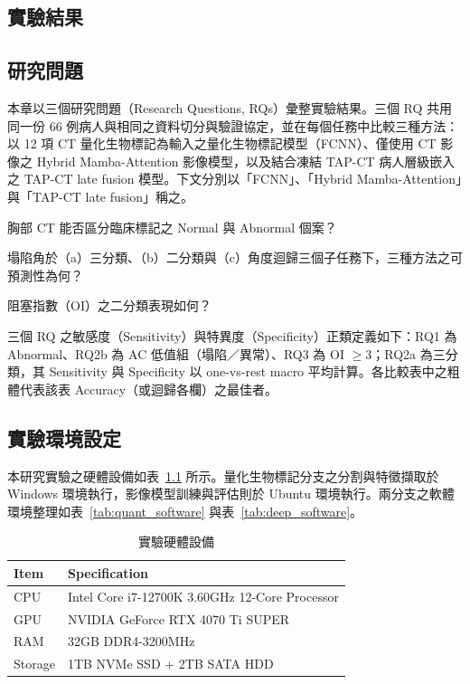 \begin{ZhChapter}

\chapter{實驗結果}

\section{研究問題}

本章以三個研究問題（Research Questions, RQs）彙整實驗結果。三個 RQ 共用同一份 66 例病人與相同之資料切分與驗證協定，並在每個任務中比較三種方法：以 12 項 CT 量化生物標記為輸入之量化生物標記模型（FCNN）、僅使用 CT 影像之 Hybrid Mamba-Attention 影像模型，以及結合凍結 TAP-CT 病人層級嵌入之 TAP-CT late fusion 模型。下文分別以「FCNN」、「Hybrid Mamba-Attention」與「TAP-CT late fusion」稱之。

\begin{list}{}{\setlength{\leftmargin}{4.2em}\setlength{\labelwidth}{3.4em}\setlength{\labelsep}{0.8em}\setlength{\itemsep}{0.35em}}
    \item[\textbf{RQ1：}]胸部 CT 能否區分臨床標記之 Normal 與 Abnormal 個案？
    \item[\textbf{RQ2：}]塌陷角於（a）三分類、（b）二分類與（c）角度迴歸三個子任務下，三種方法之可預測性為何？
    \item[\textbf{RQ3：}]阻塞指數（OI）之二分類表現如何？
\end{list}

三個 RQ 之敏感度（Sensitivity）與特異度（Specificity）正類定義如下：RQ1 為 Abnormal、RQ2b 為 AC 低值組（塌陷／異常）、RQ3 為 OI $\geq 3$；RQ2a 為三分類，其 Sensitivity 與 Specificity 以 one-vs-rest macro 平均計算。各比較表中之粗體代表該表 Accuracy（或迴歸各欄）之最佳者。

\section{實驗環境設定}\label{sec:exp_setup}

本研究實驗之硬體設備如表~\ref{tab:experiment_hardware} 所示。量化生物標記分支之分割與特徵擷取於 Windows 環境執行，影像模型訓練與評估則於 Ubuntu 環境執行。兩分支之軟體環境整理如表~\ref{tab:quant_software} 與表~\ref{tab:deep_software}。

\begin{table}[htbp]
\centering
\caption{實驗硬體設備}
\label{tab:experiment_hardware}
\begingroup
\renewcommand{\arraystretch}{1.6}
\begin{tabularx}{0.95\textwidth}{|>{\centering\arraybackslash}p{}|>{\centering\arraybackslash}X|}
\hline
\textbf{Item} & \textbf{Specification} \\
\hline
CPU & Intel Core i7-12700K 3.60GHz 12-Core Processor \\
\hline
GPU & NVIDIA GeForce RTX 4070 Ti SUPER \\
\hline
RAM & 32GB DDR4-3200MHz \\
\hline
Storage & 1TB NVMe SSD + 2TB SATA HDD \\
\hline
\end{tabularx}
\endgroup
\end{table}


\end{ZhChapter}
